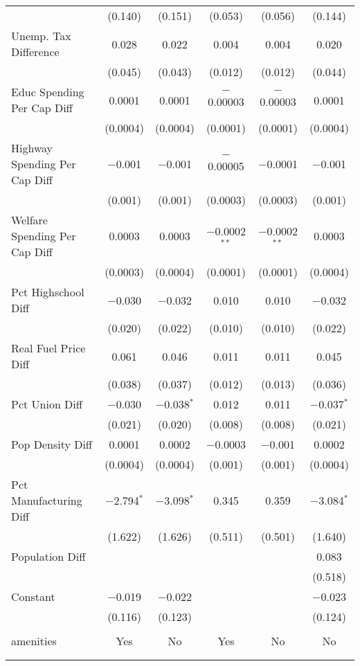 \begin{table}[!htbp]
\begin{tabular}{@{\extracolsep{5pt}}lccccc}
  & (0.140) & (0.151) & (0.053) & (0.056) & (0.144) \\ 
  Unemp. Tax Difference & 0.028 & 0.022 & 0.004 & 0.004 & 0.020 \\ 
  & (0.045) & (0.043) & (0.012) & (0.012) & (0.044) \\ 
  Educ Spending Per Cap Diff & 0.0001 & 0.0001 & $-$0.00003 & $-$0.00003 & 0.0001 \\ 
  & (0.0004) & (0.0004) & (0.0001) & (0.0001) & (0.0004) \\ 
  Highway Spending Per Cap Diff & $-$0.001 & $-$0.001 & $-$0.00005 & $-$0.0001 & $-$0.001 \\ 
  & (0.001) & (0.001) & (0.0003) & (0.0003) & (0.001) \\ 
  Welfare Spending Per Cap Diff & 0.0003 & 0.0003 & $-$0.0002$^{**}$ & $-$0.0002$^{**}$ & 0.0003 \\ 
  & (0.0003) & (0.0004) & (0.0001) & (0.0001) & (0.0004) \\ 
  Pct Highschool Diff & $-$0.030 & $-$0.032 & 0.010 & 0.010 & $-$0.032 \\ 
  & (0.020) & (0.022) & (0.010) & (0.010) & (0.022) \\ 
  Real Fuel Price Diff & 0.061 & 0.046 & 0.011 & 0.011 & 0.045 \\ 
  & (0.038) & (0.037) & (0.012) & (0.013) & (0.036) \\ 
  Pct Union Diff & $-$0.030 & $-$0.038$^{*}$ & 0.012 & 0.011 & $-$0.037$^{*}$ \\ 
  & (0.021) & (0.020) & (0.008) & (0.008) & (0.021) \\ 
  Pop Density Diff & 0.0001 & 0.0002 & $-$0.0003 & $-$0.001 & 0.0002 \\ 
  & (0.0004) & (0.0004) & (0.001) & (0.001) & (0.0004) \\ 
  Pct Manufacturing Diff & $-$2.794$^{*}$ & $-$3.098$^{*}$ & 0.345 & 0.359 & $-$3.084$^{*}$ \\ 
  & (1.622) & (1.626) & (0.511) & (0.501) & (1.640) \\ 
  Population Diff &  &  &  &  & 0.083 \\ 
  &  &  &  &  & (0.518) \\ 
  Constant & $-$0.019 & $-$0.022 &  &  & $-$0.023 \\ 
  & (0.116) & (0.123) &  &  & (0.124) \\ 
 \hline \\[-1.8ex] 
amenities & Yes & No & Yes & No & No \\ 
\hline \\[-1.8ex] 
\hline 
\hline \\[-1.8ex] 
\end{tabular} 
\end{table} 
